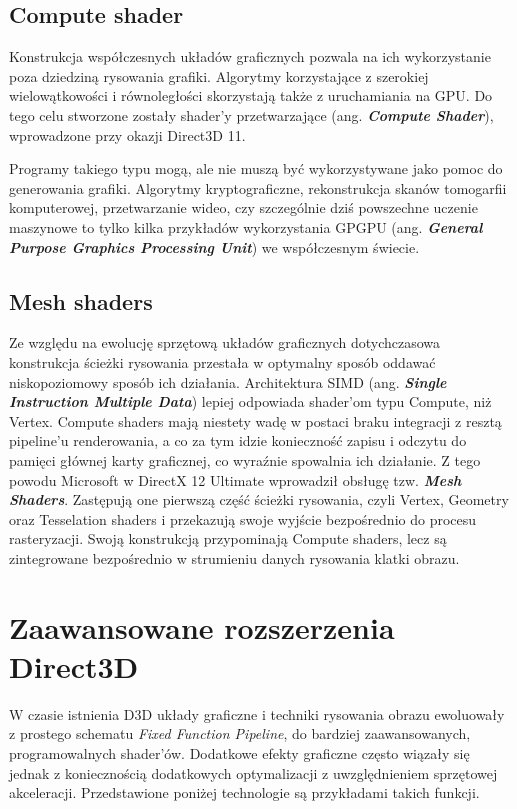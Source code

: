\subsection{Compute shader}
Konstrukcja współczesnych układów graficznych pozwala na ich
wykorzystanie poza dziedziną rysowania grafiki. Algorytmy korzystające z
szerokiej wielowątkowości i równoległości skorzystają także z
uruchamiania na GPU. Do tego celu stworzone zostały shader'y
przetwarzające (ang. \emph{\textbf{Compute Shader}}), wprowadzone przy
okazji Direct3D 11.

Programy takiego typu mogą, ale nie muszą być wykorzystywane jako pomoc
do generowania grafiki. Algorytmy kryptograficzne, rekonstrukcja skanów
tomogarfii komputerowej, przetwarzanie wideo, czy szczególnie dziś
powszechne uczenie maszynowe to tylko kilka przykładów wykorzystania
GPGPU (ang. \emph{\textbf{General Purpose Graphics Processing Unit}}) we
współczesnym świecie.

\subsection{Mesh shaders}
Ze względu na ewolucję sprzętową układów graficznych dotychczasowa
konstrukcja ścieżki rysowania przestała w optymalny sposób oddawać
niskopoziomowy sposób ich działania. Architektura SIMD (ang.
\emph{\textbf{Single Instruction Multiple Data}}) lepiej odpowiada
shader'om typu Compute, niż Vertex. Compute shaders mają niestety wadę w
postaci braku integracji z resztą pipeline'u renderowania, a co za tym
idzie konieczność zapisu i odczytu do pamięci głównej karty graficznej,
co wyraźnie spowalnia ich działanie. Z tego powodu Microsoft w DirectX 12 Ultimate wprowadził obsługę tzw.
\emph{\textbf{Mesh Shaders}}. Zastępują one pierwszą część ścieżki
rysowania, czyli Vertex, Geometry oraz Tesselation shaders i przekazują
swoje wyjście bezpośrednio do procesu rasteryzacji. Swoją konstrukcją
przypominają Compute shaders, lecz są zintegrowane bezpośrednio w
strumieniu danych rysowania klatki obrazu.

\section{Zaawansowane rozszerzenia Direct3D} %

W czasie istnienia D3D układy graficzne i techniki rysowania obrazu
ewoluowały z prostego schematu \emph{Fixed Function Pipeline}, do
bardziej zaawansowanych, programowalnych shader'ów. Dodatkowe efekty
graficzne często wiązały się jednak z koniecznością dodatkowych
optymalizacji z uwzględnieniem sprzętowej akceleracji. Przedstawione
poniżej technologie są przykładami takich funkcji.

